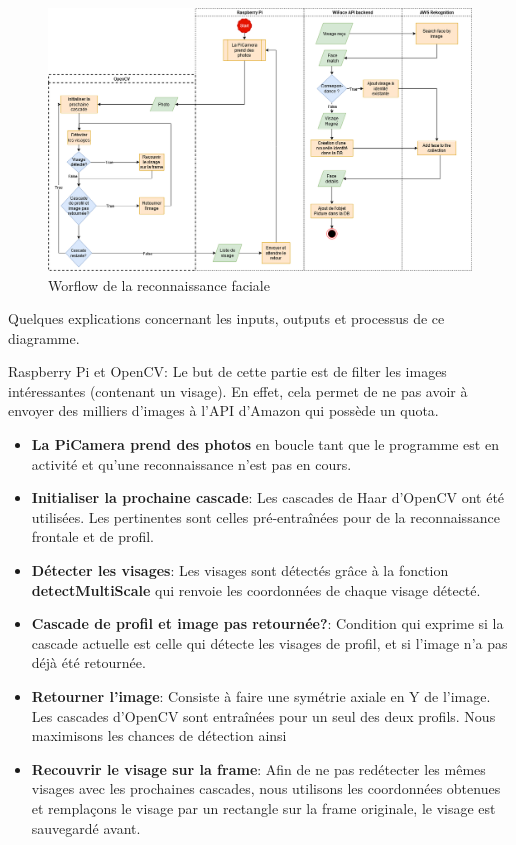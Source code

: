 \thispagestyle{empty}
\begin{landscape}
    \centering
\thispagestyle{empty}
\begin{figure}[ht]
     \includegraphics[width=0.95\linewidth]{images/facial_reco/flowchart_reco_v2.png}
     \caption{Worflow de la reconnaissance faciale}
     \label{fig:worflow-reco}
\end{figure}
\end{landscape}

Quelques explications concernant les inputs, outputs et processus de ce diagramme.

Raspberry Pi et OpenCV:
Le but de cette partie est de filter les images intéressantes (contenant un visage). En effet,
cela permet de ne pas avoir à envoyer des milliers d'images à l'API d'Amazon qui possède un quota.
\begin{itemize}
    \item \textbf{La PiCamera prend des photos} en boucle tant que le programme est en activité et qu'une reconnaissance n'est pas en cours.
    \item \textbf{Initialiser la prochaine cascade}: Les cascades de Haar d'OpenCV ont été utilisées. Les pertinentes sont celles pré-entraînées pour de la reconnaissance frontale et de profil.
    \item \textbf{Détecter les visages}: Les visages sont détectés grâce à la fonction \textbf{detectMultiScale} qui renvoie les coordonnées de chaque visage détecté.
    \item \textbf{Cascade de profil et image pas retournée?}: Condition qui exprime si la cascade actuelle est celle qui détecte les visages de profil, et si l'image n'a pas déjà été retournée.
    \item \textbf{Retourner l'image}: Consiste à faire une symétrie axiale en Y de l'image. Les cascades d'OpenCV sont entraînées pour un seul des deux profils. Nous maximisons les chances de détection ainsi
    \item \textbf{Recouvrir le visage sur la frame}: Afin de ne pas redétecter les mêmes visages avec les prochaines cascades, nous utilisons les coordonnées obtenues et remplaçons le visage par un rectangle sur la frame originale, le visage est sauvegardé avant.
\end{itemize}

